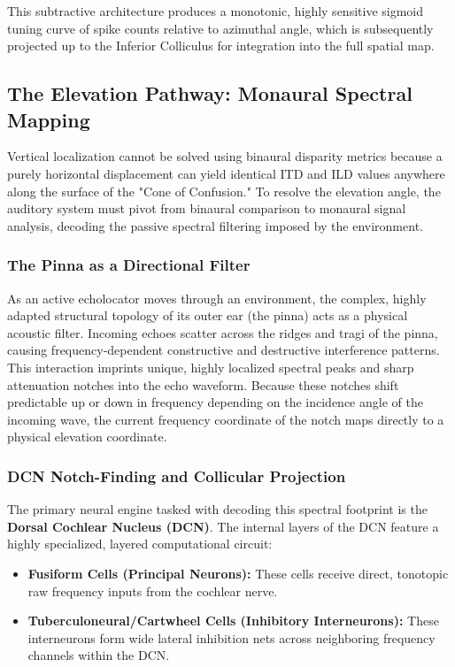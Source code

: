 This subtractive architecture produces a monotonic, highly sensitive sigmoid tuning curve of spike counts relative to azimuthal angle, which is subsequently projected up to the Inferior Colliculus for integration into the full spatial map.

\subsection{The Elevation Pathway: Monaural Spectral Mapping}
\label{sec:elevation_pathway}
Vertical localization cannot be solved using binaural disparity metrics because a purely horizontal displacement can yield identical ITD and ILD values anywhere along the surface of the "Cone of Confusion." To resolve the elevation angle, the auditory system must pivot from binaural comparison to monaural signal analysis, decoding the passive spectral filtering imposed by the environment.

\subsubsection{The Pinna as a Directional Filter}
As an active echolocator moves through an environment, the complex, highly adapted structural topology of its outer ear (the pinna) acts as a physical acoustic filter. Incoming echoes scatter across the ridges and tragi of the pinna, causing frequency-dependent constructive and destructive interference patterns. This interaction imprints unique, highly localized spectral peaks and sharp attenuation notches into the echo waveform. Because these notches shift predictable up or down in frequency depending on the incidence angle of the incoming wave, the current frequency coordinate of the notch maps directly to a physical elevation coordinate.

\subsubsection{DCN Notch-Finding and Collicular Projection}
The primary neural engine tasked with decoding this spectral footprint is the \textbf{Dorsal Cochlear Nucleus (DCN)}. The internal layers of the DCN feature a highly specialized, layered computational circuit:
\begin{itemize}
    \item \textbf{Fusiform Cells (Principal Neurons):} These cells receive direct, tonotopic raw frequency inputs from the cochlear nerve.
    \item \textbf{Tuberculoneural/Cartwheel Cells (Inhibitory Interneurons):} These interneurons form wide lateral inhibition nets across neighboring frequency channels within the DCN.
\end{itemize}

